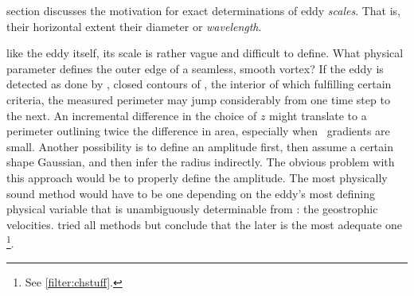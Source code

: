 
 section discusses the motivation for exact determinations of eddy \textit{scales}. That is, their horizontal extent \ie their diameter or \textit{wavelength}.

 like the eddy itself, its scale is rather vague and difficult to define. What physical parameter defines the outer edge of a seamless, smooth vortex? If the eddy is detected as done by \citet{Chelton2011}, \ie closed contours of \SSH, the interior of which fulfilling certain criteria, the measured perimeter may jump considerably from one time step to the next. An incremental difference in the choice of $z$ might translate to a perimeter outlining twice the  difference in area, especially when \SSH~gradients are small. Another possibility is to define an amplitude first, then assume a certain shape \eg Gaussian, and then infer the radius indirectly. The obvious problem with this approach would be to properly define the amplitude. The most physically sound method would have to be one depending on the eddy's most defining physical variable that is unambiguously determinable from \SSH: the geostrophic velocities. \citet{Chelton2011} tried all methods but conclude that the later is the most adequate one \footnote{See \cref{filter:chstuff}.}.

%



